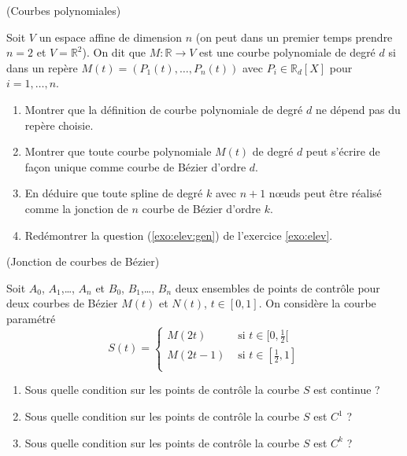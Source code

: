 \documentclass[a4paper,12pt,reqno]{amsart}
\begin{document}
\begin{exo} (Courbes polynomiales)

    Soit $V$ un espace affine de dimension $n$ (on peut dans un premier temps prendre $n=2$ et $V=\mathbb{R}^{2}$). On dit que $M:\mathbb{R} \rightarrow V$ est une courbe polynomiale de degré $d$ si dans un repère $M(t) = (P_{1}(t),\ldots,P_{n}(t))$ avec $P_{i} \in \mathbb{R}_{d}[X]$ pour $i=1,\ldots,n$.

  \begin{enumerate}

    \item Montrer que la définition de courbe polynomiale de degré $d$ ne dépend pas du repère choisie.

    \item Montrer que toute courbe polynomiale $M(t)$ de degré $d$ peut s'écrire de façon unique comme courbe de Bézier d'ordre $d$.

    \item En déduire que toute spline de degré $k$ avec $n+1$ nœuds peut être réalisé comme la jonction de $n$ courbe de Bézier d'ordre $k$.

    \item Redémontrer la question (\ref{exo:elev:gen}) de l'exercice \ref{exo:elev}.

  \end{enumerate}
\end{exo}

\begin{exo} (Jonction de courbes de Bézier)

  Soit $A_{0}$, $A_{1}$,\dots, $A_{n}$ et $B_{0}$, $B_{1}$,\dots, $B_{n}$ deux ensembles de points de contrôle pour deux courbes de Bézier $M(t)$ et $N(t)$, $t \in [0,1]$. On considère la courbe paramétré
  $$
    S(t) =
      \begin{cases}
        M(2t) & \text{ si } t \in [0,\frac12[ \\
        M(2t-1) & \text{ si } t \in [\frac12,1] \\
      \end{cases}
  $$
  \begin{enumerate}
    \item Sous quelle condition sur les points de contrôle la courbe $S$ est continue ?

    \item Sous quelle condition sur les points de contrôle la courbe $S$ est $C^{1}$ ?

    \item Sous quelle condition sur les points de contrôle la courbe $S$ est $C^{k}$ ?
  \end{enumerate}

\end{exo}
\end{document}

